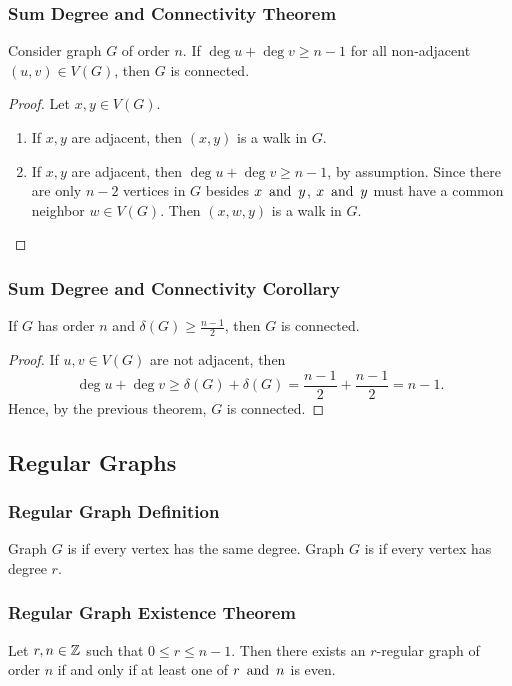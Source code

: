 \subsubsection*{Sum Degree and Connectivity Theorem}
Consider graph $G$ of order $n$. If $\deg u + \deg v \geq n-1$ for all non-adjacent $(u,v) \in V(G)$, then $G$ is connected.
\begin{proof}
    Let $x,y \in V(G)$.
    \begin{enumerate}[start=1,label={\bfseries Case \arabic*:},leftmargin=0.75in]
        \item If $x,y$ are adjacent, then $(x,y)$ is a walk in $G$.
        \item If $x,y$ are  adjacent, then $\deg u + \deg v \geq n-1$, by assumption. Since there are only $n-2$ vertices in $G$ besides $x \operatorname{~\text{and}~} y$, $x \operatorname{~\text{and}~} y$ must have a common neighbor $w \in V(G)$. Then $(x,w,y)$ is a walk in $G$.
    \end{enumerate}
\end{proof}

\subsubsection*{Sum Degree and Connectivity Corollary}
If $G$ has order $n$ and $\delta(G) \geq \frac{n-1}{2}$, then $G$ is connected.
\begin{proof}
    If $u,v \in V(G)$ are not adjacent, then
    \[
        \deg u + \deg v \geq \delta(G) + \delta(G) = \frac{n-1}{2} + \frac{n-1}{2} = n-1.
    \]
    Hence, by the previous theorem, $G$ is connected.
\end{proof}

\subsection{Regular Graphs}

\subsubsection*{Regular Graph Definition}
Graph $G$ is  if every vertex has the same degree. Graph $G$ is  if every vertex has degree $r$.

\subsubsection*{Regular Graph Existence Theorem}
Let $r,n \in \mathbb{Z}$ such that $0 \leq r \leq n-1$. Then there exists an $r$-regular graph of order $n$ if and only if at least one of $r \operatorname{~\text{and}~} n$ is even.

